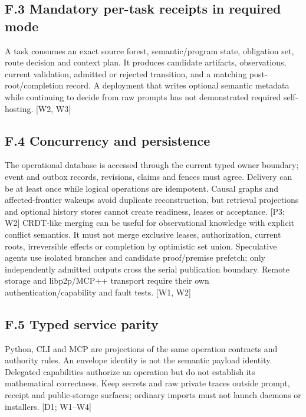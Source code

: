 \documentclass{article}
\begin{document}
\subsection*{F.3 Mandatory per-task receipts in required mode}

A task consumes an exact source forest, semantic/program state, obligation set, route decision and
context plan. It produces candidate artifacts, observations, current validation, admitted or rejected
transition, and a matching post-root/completion record. A deployment that writes optional semantic
metadata while continuing to decide from raw prompts has not demonstrated required self-hosting.
[W2, W3]

\subsection*{F.4 Concurrency and persistence}

The operational database is accessed through the current typed owner boundary; event and outbox
records, revisions, claims and fences must agree. Delivery can be at least once while logical operations
are idempotent. Causal graphs and affected-frontier wakeups avoid duplicate reconstruction, but
retrieval projections and optional history stores cannot create readiness, leases or acceptance. [P3;
W2]
CRDT-like merging can be useful for observational knowledge with explicit conflict semantics. It
must not merge exclusive leases, authorization, current roots, irreversible effects or completion by
optimistic set union. Speculative agents use isolated branches and candidate proof/premise prefetch;
only independently admitted outputs cross the serial publication boundary. Remote storage and
libp2p/MCP++ transport require their own authentication/capability and fault tests. [W1, W2]

\subsection*{F.5 Typed service parity}

Python, CLI and MCP are projections of the same operation contracts and authority rules. An
envelope identity is not the semantic payload identity. Delegated capabilities authorize an operation
but do not establish its mathematical correctness. Keep secrets and raw private traces outside prompt,
receipt and public-storage surfaces; ordinary imports must not launch daemons or installers. [D1;
W1–W4]
\end{document}
